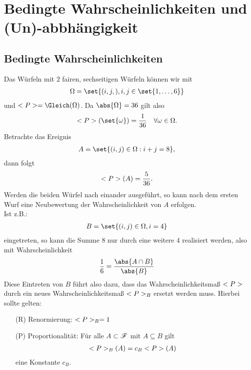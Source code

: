 \chapter{Bedingte Wahrscheinlichkeiten und (Un)-abbhängigkeit}

\section{Bedingte Wahrscheinlichkeiten}

\begin{example}
	Das Würfeln mit $2$ fairen, sechseitigen Würfeln können wir mit 
	\begin{align}
		\Omega = \set{(i,j,), i,j \in \set{1,\dots,6}}\notag
	\end{align}
	und $\probp = \Gleich(\Omega)$. Da $\abs{\Omega} = 36$ gilt also
	\begin{align}
		\probp(\set{\omega}) = \frac{1}{36} \quad \forall \omega \in \Omega.\notag
	\end{align}
	Betrachte das Ereignis
	\begin{align}
		A = \set{(i,j) \in \Omega : i + j = 8},\notag
	\end{align}
	dann folgt
	\begin{align}
		<P>(A) = \frac{5}{36}.\notag
	\end{align}
	Werden die beiden Würfel nach einander ausgeführt, so kann nach dem ersten Wurf eine Neubewertung der Wahrscheinlichkeit von $A$ erfolgen.\\
	Ist z.B.:
	\begin{align}
		B = \set{(i,j) \in \Omega, i = 4}\notag
	\end{align}
	eingetreten, so kann die Summe $8$ nur durch eine weitere $4$ realisiert werden, also mit Wahrscheinlichkeit
	\begin{align}
		\frac{1}{6} = \frac{\abs{A \cap B}}{\abs{B}}\notag 
	\end{align}
	Diese Eintreten von $B$ führt also dazu, dass das Wahrscheinlichkeitsmaß $<P>$ durch ein neues Wahrscheinlichkeitsmaß $<P>_{B}$ ersetzt werden muss. Hierbei sollte gelten:
	\begin{itemize}
		\item[(R)] Renormierung: $<P>_{B} = 1$
		\item[(P)] Proportionalität: Für alle $A \subset \mathscr{F}$ mit $A \subseteq B$ gilt
		\begin{align}
			<P>_{B}(A) = c_B <P>(A)\notag
		\end{align}
		eine Konstante $c_B$.
	\end{itemize}
\end{example}

